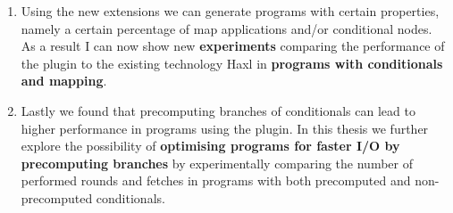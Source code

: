 \begin{enumerate}
    \item Using the new extensions we can generate programs with certain properties, namely a certain percentage of map applications and/or conditional nodes.
    As a result I can now show new \textbf{experiments} comparing the performance of the \yauhau{} plugin to the existing technology Haxl in \textbf{programs with conditionals and mapping}.
    \item Lastly we found that precomputing branches of conditionals can lead to higher performance in programs using the \yauhau{} plugin.
    In this thesis we further explore the possibility of \textbf{optimising programs for faster I/O by precomputing branches} by experimentally comparing the number of performed rounds and fetches in programs with both precomputed and non-precomputed conditionals.
\end{enumerate}
